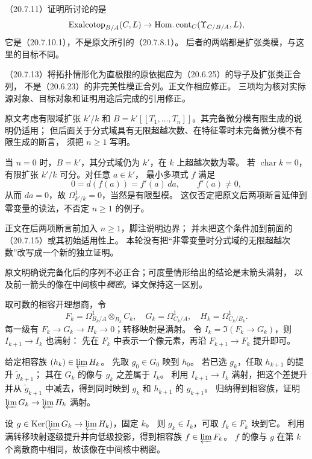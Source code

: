 （20.7.11）证明所讨论的是
\[
 \operatorname{Exalcotop}_{B/A}(C,L)\to\operatorname{Hom.cont}_C(\Upsilon_{C/B/A},L),
\]
它是（20.7.10.1），不是原文所引的（20.7.8.1）。
后者的两端都是扩张类模，与这里的目标不同。

（20.7.13）将拓扑情形化为直极限的原依据应为（20.6.25）的导子及扩张类正合列，
不是（20.6.23）的非完美性模正合列。正文作相应修正。
三项均为核对实际源对象、目标对象和证明用途后完成的引用修正。

原文考虑有限域扩张 $k'/k$ 和
$B=k'[[T_1,\ldots,T_n]]$。其完备微分模有限生成的说明仍适用；
但后面关于分式域具有无限超越次数、在特征零时未完备微分模不有限生成的断言，
须把 $n\ge1$ 写明。

当 $n=0$ 时，$B=k'$，其分式域仍为 $k'$，在 $k$ 上超越次数为零。
若 $\operatorname{char}k=0$，有限扩张 $k'/k$ 可分。对任意 $a\in k'$，
最小多项式 $f$ 满足
\[
 0=d(f(a))=f'(a)\,da,\qquad f'(a)\ne0,
\]
从而 $da=0$，故 $\Omega^1_{k'/k}=0$，当然是有限型模。
这仅否定把原文后两项断言延伸到零变量的读法，不否定 $n\ge1$ 的例子。

正文在后两项断言前加入 $n\ge1$，脚注说明边界；
并未把这个条件加到前面的（20.7.15）或其初始适用性上。
本轮没有把“非零变量时分式域的无限超越次数”改写成一个新的独立证明。

原文明确说完备化后的序列不必正合；可度量情形给出的结论是末箭头满射，
以及前一箭头的像在中间核中\emph{稠密}。译文保持这一区别。

取可数的相容开理想商，令
\[
 F_k=\Omega^1_{B_k/A}\otimes_{B_k}C_k,\quad
 G_k=\Omega^1_{C_k/A},\quad H_k=\Omega^1_{C_k/B_k}.
\]
每一级有 $F_k\to G_k\to H_k\to0$；转移映射是满射。
令 $I_k=\Im(F_k\to G_k)$，则 $I_{k+1}\to I_k$ 也满射：
先在 $F_k$ 中表示一个像元素，再沿 $F_{k+1}\to F_k$ 提升即可。

给定相容族 $(h_k)\in\varprojlim H_k$。
先取 $g_0\in G_0$ 映到 $h_0$。
若已选 $g_k$，任取 $h_{k+1}$ 的提升 $\widetilde g_{k+1}$；
其在 $G_k$ 的像与 $g_k$ 之差属于 $I_k$。
利用 $I_{k+1}\to I_k$ 满射，把这个差提升并从
$\widetilde g_{k+1}$ 中减去，得到同时映到 $g_k$ 和 $h_{k+1}$ 的 $g_{k+1}$。
归纳得到相容族，证明 $\varprojlim G_k\to\varprojlim H_k$ 满射。

设 $g\in\operatorname{Ker}(\varprojlim G_k\to\varprojlim H_k)$，固定 $k$。
则 $g_k\in I_k$，可取 $f_k\in F_k$ 映到它。
利用满转移映射逐级提升并向低级投影，得到相容族 $f\in\varprojlim F_k$。
$f$ 的像与 $g$ 在第 $k$ 个离散商中相同，故该像在中间核中稠密。

